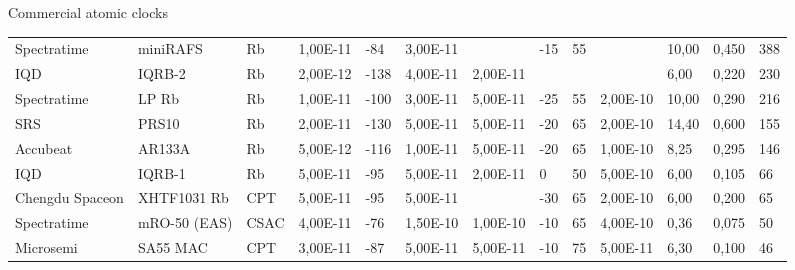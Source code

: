 \begin{frame}{Commercial atomic clocks}
\begin{table}
{\begin{tabular}{ll|lllllllllll}
                Spectratime     & miniRAFS         & Rb            & 1,00E-11      & -84                    & 3,00E-11       & ~                & -15                    & 55                     & ~               & 10,00          & 0,450           & 388                     \\
                IQD             & IQRB-2           & Rb            & 2,00E-12      & -138                   & 4,00E-11       & 2,00E-11         & ~                      & ~                      & ~               & 6,00           & 0,220           & 230                     \\
                Spectratime     & LP Rb            & Rb            & 1,00E-11      & -100                   & 3,00E-11       & 5,00E-11         & -25                    & 55                     & 2,00E-10        & 10,00          & 0,290           & 216                     \\
                SRS             & PRS10            & Rb            & 2,00E-11      & -130                   & 5,00E-11       & 5,00E-11         & -20                    & 65                     & 2,00E-10        & 14,40          & 0,600           & 155                     \\
                Accubeat        & AR133A           & Rb            & 5,00E-12      & -116                   & 1,00E-11       & 5,00E-11         & -20                    & 65                     & 1,00E-10        & 8,25           & 0,295           & 146                     \\
                IQD             & IQRB-1           & Rb            & 5,00E-11      & -95                    & 5,00E-11       & 2,00E-11         & 0                      & 50                     & 5,00E-10        & 6,00           & 0,105           & 66                      \\
                Chengdu Spaceon & XHTF1031 Rb      & CPT           & 5,00E-11      & -95                    & 5,00E-11       & ~                & -30                    & 65                     & 2,00E-10        & 6,00           & 0,200           & 65                      \\
                Spectratime     & mRO-50 (EAS)     & CSAC          & 4,00E-11      & -76                    & 1,50E-10       & 1,00E-10         & -10                    & 65                     & 4,00E-10        & 0,36           & 0,075           & 50                      \\
                Microsemi       & SA55 MAC         & CPT           & 3,00E-11      & -87                    & 5,00E-11       & 5,00E-11         & -10                    & 75                     & 5,00E-11        & 6,30           & 0,100           & 46                      \\

\end{tabular}}
\end{table}
\end{frame}
